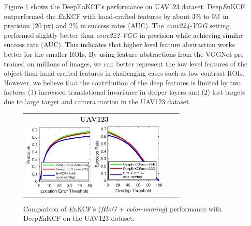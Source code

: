\documentclass[10pt,twocolumn,letterpaper]{article}
\begin{document}
Figure \ref{fig:UAV123_DATASET_DeepFeatures} shows the DeepE{\it n}KCF's
performance on UAV123 dataset. Deep{\it E}nKCF outperformed the {\it
  E}nKCF with hand-crafted features by about $3\%$ to $5\%$ in
precision (20 px) and $2\%$ in success rates (AUC). The
\textit{conv224-VGG} setting performed slightly better than
\textit{conv222-VGG} in precision while achieving similar success rate
(AUC). This indicates that higher level feature abstraction works
better for the smaller ROIs. By using feature abstractions from the
VGGNet pre-trained on millions of images, we can better represent the
low level features of the object than hand-crafted features in
challenging cases such as low contrast ROIs. However, we believe that
the contribution of the deep features is limited by two factors: (1)
increased translational invariance in deeper layers and (2) lost targets due to
large target and camera motion in the UAV123 dataset.

\begin{figure}[!h]
\centering
\begin{tabular}{ccc}
\tiny\quad\quad\textbf{UAV123}\\
\includegraphics[width=3.60cm]{./figures/pr_deep.eps}
\includegraphics[width=3.70cm]{./figures/sr_deep.eps}\\
\end{tabular}
\caption{Comparison of {\it E}nKCF's ({\it fHoG} + {\it color-naming}) performance with Deep{\it E}nKCF on the UAV123
dataset.}
\label{fig:UAV123_DATASET_DeepFeatures}
\end{figure}
\end{document}
